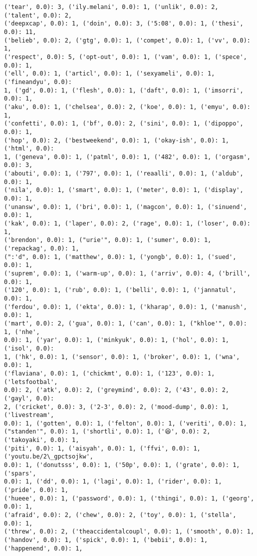 \documentclass[11pt]{article}
\begin{document}
\begin{Verbatim}[commandchars=\\\{\}]
('tear', 0.0): 3, ('ily.melani', 0.0): 1, ('unlik', 0.0): 2, ('talent', 0.0): 2,
('deepxcap', 0.0): 1, ('doin', 0.0): 3, ('5:08', 0.0): 1, ('thesi', 0.0): 11,
('belieb', 0.0): 2, ('gtg', 0.0): 1, ('compet', 0.0): 1, ('vv', 0.0): 1,
('respect', 0.0): 5, ('opt-out', 0.0): 1, ('vam', 0.0): 1, ('spece', 0.0): 1,
('ell', 0.0): 1, ('articl', 0.0): 1, ('sexyameli', 0.0): 1, ('fineandyu', 0.0):
1, ('gd', 0.0): 1, ('flesh', 0.0): 1, ('daft', 0.0): 1, ('imsorri', 0.0): 1,
('aku', 0.0): 1, ('chelsea', 0.0): 2, ('koe', 0.0): 1, ('emyu', 0.0): 1,
('confetti', 0.0): 1, ('bf', 0.0): 2, ('sini', 0.0): 1, ('dipoppo', 0.0): 1,
('hop', 0.0): 2, ('bestweekend', 0.0): 1, ('okay-ish', 0.0): 1, ('html', 0.0):
1, ('geneva', 0.0): 1, ('patml', 0.0): 1, ('482', 0.0): 1, ('orgasm', 0.0): 3,
('abouti', 0.0): 1, ('797', 0.0): 1, ('reaalli', 0.0): 1, ('aldub', 0.0): 1,
('nila', 0.0): 1, ('smart', 0.0): 1, ('meter', 0.0): 1, ('display', 0.0): 1,
('unansw', 0.0): 1, ('bri', 0.0): 1, ('magcon', 0.0): 1, ('sinuend', 0.0): 1,
('kak', 0.0): 1, ('laper', 0.0): 2, ('rage', 0.0): 1, ('loser', 0.0): 1,
('brendon', 0.0): 1, ("urie'", 0.0): 1, ('sumer', 0.0): 1, ('repackag', 0.0): 1,
(":'d", 0.0): 1, ('matthew', 0.0): 1, ('yongb', 0.0): 1, ('sued', 0.0): 1,
('suprem', 0.0): 1, ('warm-up', 0.0): 1, ('arriv', 0.0): 4, ('brill', 0.0): 1,
('120', 0.0): 1, ('rub', 0.0): 1, ('belli', 0.0): 1, ('jannatul', 0.0): 1,
('ferdou', 0.0): 1, ('ekta', 0.0): 1, ('kharap', 0.0): 1, ('manush', 0.0): 1,
('mart', 0.0): 2, ('gua', 0.0): 1, ('can', 0.0): 1, ("khloe'", 0.0): 1, ('nhe',
0.0): 1, ('yar', 0.0): 1, ('minkyuk', 0.0): 1, ('hol', 0.0): 1, ('isol', 0.0):
1, ('hk', 0.0): 1, ('sensor', 0.0): 1, ('broker', 0.0): 1, ('wna', 0.0): 1,
('flaviana', 0.0): 1, ('chickmt', 0.0): 1, ('123', 0.0): 1, ('letsfootbal',
0.0): 2, ('atk', 0.0): 2, ('greymind', 0.0): 2, ('43', 0.0): 2, ('gayl', 0.0):
2, ('cricket', 0.0): 3, ('2-3', 0.0): 2, ('mood-dump', 0.0): 1, ('livestream',
0.0): 1, ('gotten', 0.0): 1, ('felton', 0.0): 1, ('veriti', 0.0): 1,
("standen'", 0.0): 1, ('shortli', 0.0): 1, ('😆', 0.0): 2, ('takoyaki', 0.0): 1,
('piti', 0.0): 1, ('aisyah', 0.0): 1, ('ffvi', 0.0): 1, ('youtu.be/2\_gpctsojkw',
0.0): 1, ('donutsss', 0.0): 1, ('50p', 0.0): 1, ('grate', 0.0): 1, ('spars',
0.0): 1, ('dd', 0.0): 1, ('lagi', 0.0): 1, ('rider', 0.0): 1, ('pride', 0.0): 1,
('hueee', 0.0): 1, ('password', 0.0): 1, ('thingi', 0.0): 1, ('georg', 0.0): 1,
('afraid', 0.0): 2, ('chew', 0.0): 2, ('toy', 0.0): 1, ('stella', 0.0): 1,
('threw', 0.0): 2, ('theaccidentalcoupl', 0.0): 1, ('smooth', 0.0): 1,
('handov', 0.0): 1, ('spick', 0.0): 1, ('bebii', 0.0): 1, ('happenend', 0.0): 1,

\end{Verbatim}
\end{document}
